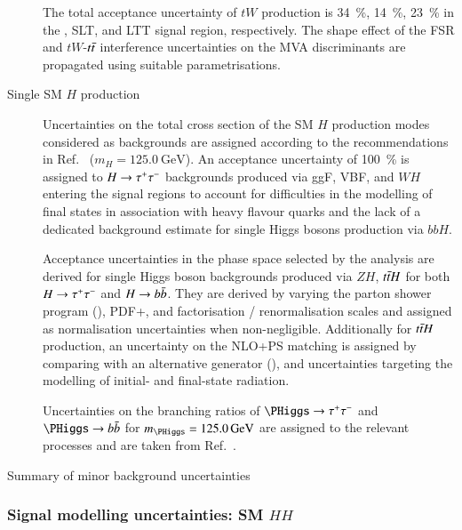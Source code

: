 \begin{description}
  The total acceptance uncertainty of $tW$ production is
  \SI{34}{\percent}, \SI{14}{\percent}, \SI{23}{\percent} in the
  \hadhad, \lephad SLT, and \lephad LTT signal region,
  respectively. The shape effect of the FSR and $tW$-$t\bar{t}$
  interference uncertainties on the MVA discriminants are propagated
  using suitable parametrisations.

\item[Single SM $H$ production] Uncertainties on the total cross
  section of the SM $H$ production modes considered as backgrounds are
  assigned according to the recommendations in
  Ref.~\cite{deFlorian:2016spz} ($m_{H} = \SI{125.0}{\GeV}$). An
  acceptance uncertainty of \SI{100}{\percent} is assigned to
  $H \to \tau^{+} \tau^{-}$ backgrounds produced via ggF, VBF, and $WH$ entering
  the signal regions to account for difficulties in the modelling of
  final states in association with heavy flavour
  quarks and the lack of a dedicated background
  estimate for single Higgs bosons production via $bbH$.

  Acceptance uncertainties in the phase space selected by the analysis
  are derived for single Higgs boson backgrounds produced via $ZH$,
  $t\bar{t} H$ for both $H \to \tau^{+} \tau^{-}$ and $H \to b\bar{b}$. They are
  derived by varying the parton shower program (\HERWIG[7]),
  PDF+\alphas, and factorisation / renormalisation scales and assigned
  as normalisation uncertainties when non-negligible. Additionally for
  $t\bar{t} H$ production, an uncertainty on the NLO+PS matching is
  assigned by comparing with an alternative generator
  (\MGNLO[v2.6.0]), and uncertainties targeting the modelling of
  initial- and final-state radiation.

  Uncertainties on the branching ratios of $\PHiggs \to \tautau$ and
  $\PHiggs \to \bbbar$ for $m_{\PHiggs} = \SI{125.0}{\GeV}$ are
  assigned to the relevant processes and are taken from
  Ref.~\cite{deFlorian:2016spz}.
\end{description}


\begin{table}[htbp]
  \centering


  \caption{Summary of minor background uncertainties}
\end{table}

\subsubsection{Signal modelling uncertainties: SM $HH$}

